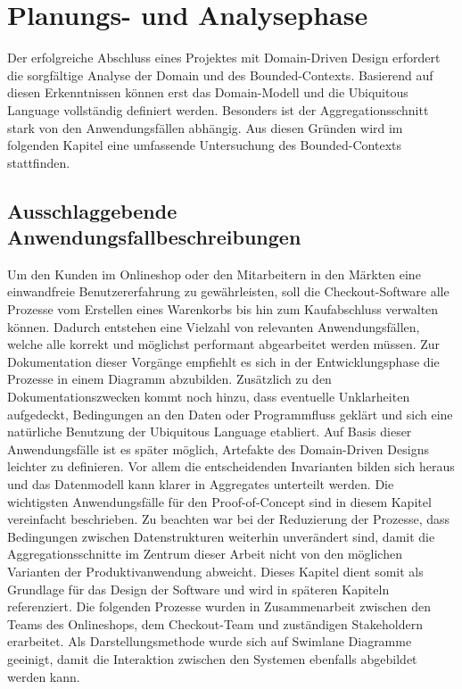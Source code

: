 

\chapter{Planungs- und Analysephase}

Der erfolgreiche Abschluss eines Projektes mit Domain-Driven Design erfordert die sorgfältige Analyse der Domain und des Bounded-Contexts. Basierend auf diesen Erkenntnissen können erst das Domain-Modell und die Ubiquitous Language vollständig definiert werden. Besonders ist der Aggregationsschnitt stark von den Anwendungsfällen abhängig. Aus diesen Gründen wird im folgenden Kapitel eine umfassende Untersuchung des Bounded-Contexts stattfinden.

\section{Ausschlaggebende Anwendungsfallbeschreibungen}

Um den Kunden im Onlineshop oder den Mitarbeitern in den Märkten eine einwandfreie Benutzererfahrung zu gewährleisten, soll die Checkout-Software alle Prozesse vom Erstellen eines Warenkorbs bis hin zum Kaufabschluss verwalten können. Dadurch entstehen eine Vielzahl von relevanten Anwendungsfällen, welche alle korrekt und möglichst performant abgearbeitet werden müssen. Zur Dokumentation dieser Vorgänge empfiehlt es sich in der Entwicklungsphase die Prozesse in einem Diagramm abzubilden. Zusätzlich zu den Dokumentationszwecken kommt noch hinzu, dass eventuelle Unklarheiten aufgedeckt, Bedingungen an den Daten oder Programmfluss geklärt und sich eine natürliche Benutzung der Ubiquitous Language etabliert. Auf Basis dieser Anwendungsfälle ist es später möglich, Artefakte des Domain-Driven Designs leichter zu definieren. Vor allem die entscheidenden Invarianten bilden sich heraus und das Datenmodell kann klarer in Aggregates unterteilt werden. Die wichtigsten Anwendungsfälle für den Proof-of-Concept sind in diesem Kapitel vereinfacht beschrieben. Zu beachten war bei der Reduzierung der Prozesse, dass Bedingungen zwischen Datenstrukturen weiterhin unverändert sind, damit die Aggregationsschnitte im Zentrum dieser Arbeit nicht von den möglichen Varianten der Produktivanwendung abweicht. Dieses Kapitel dient somit als Grundlage für das Design der Software und wird in späteren Kapiteln referenziert. Die folgenden Prozesse wurden in Zusammenarbeit zwischen den Teams des Onlineshops, dem Checkout-Team und zuständigen \Gls{Stakeholder}n erarbeitet. Als Darstellungsmethode wurde sich auf Swimlane Diagramme geeinigt, damit die Interaktion zwischen den Systemen ebenfalls abgebildet werden kann.

